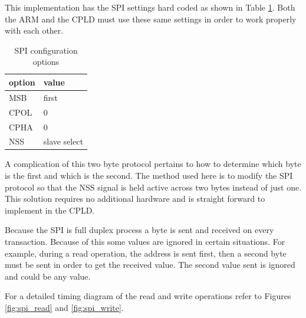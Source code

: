 \documentclass{article}
\begin{document}
This implementation has the SPI settings hard coded as shown
in Table \ref{tbl:spi}.
Both the ARM and the CPLD must use these same settings in order
to work properly with each other.

\begin{table}
\center
\begin{tabular}{|l|l|}
	\hline
	option & value \\
	\hline
	MSB & first \\
	CPOL & 0 \\
	CPHA & 0 \\
	NSS & slave select\\
	\hline
\end{tabular}
\caption{SPI configuration options}
\label{tbl:spi}
\end{table}

A complication of this two byte protocol pertains to how to
determine which byte is the first and which is the second.
The method used here is to modify the SPI protocol so that the NSS
signal is held active across two bytes instead of just one.
This solution requires no additional hardware and is straight forward
to implement in the CPLD.

Because the SPI is full duplex process a byte is sent and received
on every transaction.
Because of this some values are ignored in certain situations.
For example, during a read operation, the address is sent
first, then a second byte must be sent in order to get
the received value.
The second value sent is ignored and could be any value.

For a detailed timing diagram of the read and write operations refer
to Figures \ref{fig:spi_read} and \ref{fig:spi_write}.
\end{document}
